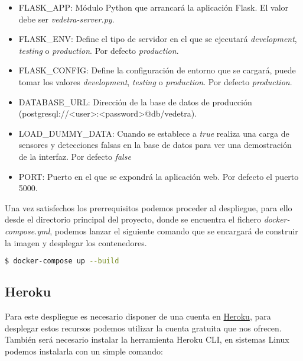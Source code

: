 \documentclass[../proyecto.tex]{subfiles}
\begin{document}
\begin{itemize}
  \item FLASK\_APP: Módulo Python que arrancará la aplicación Flask. El valor debe ser \textit{vedetra-server.py}.
  \item FLASK\_ENV: Define el tipo de servidor en el que se ejecutará \textit{development}, \textit{testing} o \textit{production}. Por defecto \textit{production}.
  \item FLASK\_CONFIG: Define la configuración de entorno que se cargará, puede tomar los valores  \textit{development}, \textit{testing} o \textit{production}. Por defecto \textit{production}.
  \item DATABASE\_URL: Dirección de la base de datos de producción \linebreak (postgresql://<user>:<password>@db/vedetra).
  \item LOAD\_DUMMY\_DATA: Cuando se establece a \textit{true} realiza una carga de sensores y detecciones falsas en la base de datos para ver una demostración de la interfaz. Por defecto \textit{false}
  \item PORT: Puerto en el que se expondrá la aplicación web. Por defecto el puerto 5000.
\end{itemize}

Una vez satisfechos los prerrequisitos podemos proceder al despliegue, para ello desde el directorio principal del proyecto, donde se encuentra el fichero \textit{docker-compose.yml},  podemos lanzar el siguiente comando que se encargará de construir la imagen y desplegar los contenedores.\\

\begin{minipage}{\linewidth}
\begin{lstlisting}[language=bash, caption=Despliegue con \textit{docker-compose.yml}, captionpos=b, frame=single]
$ docker-compose up --build
\end{lstlisting}
\end{minipage}

\subsection{Heroku}
Para este despliegue es necesario disponer de una cuenta en \href{https://www.heroku.com/}{Heroku}, para desplegar estos recursos podemos utilizar la cuenta gratuita que nos ofrecen. También será necesario instalar la herramienta Heroku CLI, en sistemas Linux podemos instalarla con un simple comando:\\
\end{document}
